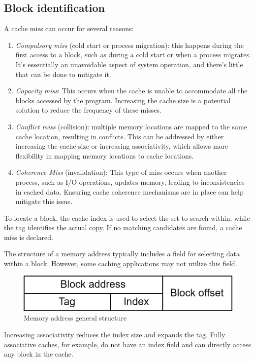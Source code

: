 \subsection{Block identification}
A cache miss can occur for several reasons:
\begin{enumerate}
    \item \textit{Compulsory miss} (cold start or process migration): this happens during the first access to a block, such as during a cold start or when a process migrates. 
        It's essentially an unavoidable aspect of system operation, and there's little that can be done to mitigate it.
    \item \textit{Capacity miss}: This occurs when the cache is unable to accommodate all the blocks accessed by the program. 
        Increasing the cache size is a potential solution to reduce the frequency of these misses.
    \item \textit{Conflict miss} (collision): multiple memory locations are mapped to the same cache location, resulting in conflicts.
        This can be addressed by either increasing the cache size or increasing associativity, which allows more flexibility in mapping memory locations to cache locations.
    \item \textit{Coherence Miss} (invalidation): This type of miss occurs when another process, such as I/O operations, updates memory, leading to inconsistencies in cached data. 
        Ensuring cache coherence mechanisms are in place can help mitigate this issue.
\end{enumerate}

To locate a block, the cache index is used to select the set to search within, while the tag identifies the actual copy. 
If no matching candidates are found, a cache miss is declared.

The structure of a memory address typically includes a field for selecting data within a block. 
However, some caching applications may not utilize this field.
\begin{figure}[H]
    \centering
    \includegraphics[width=0.5\linewidth]{images/address.png}
    \caption{Memory address general structure}
\end{figure}
Increasing associativity reduces the index size and expands the tag. 
Fully associative caches, for example, do not have an index field and can directly access any block in the cache. 

